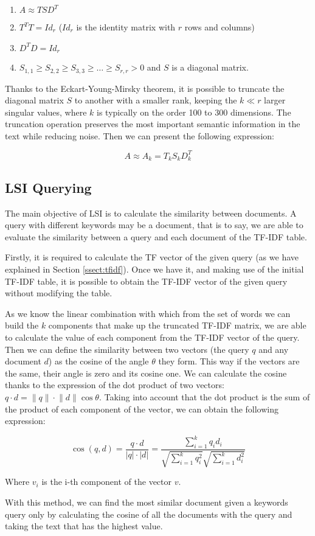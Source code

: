 \begin{enumerate}
	\item $A\approx TSD^T$
	\item $T^TT = Id_r$ ($Id_r$ is the identity matrix with $r$ rows and columns)
	\item $D^TD = Id_r$
	\item $S_{1,1}\geq S_{2,2}\geq S_{3,3}\geq\ldots\geq S_{r,r}>0$ and $S$ is a diagonal matrix.
\end{enumerate}

Thanks to the Eckart-Young-Mirsky \citep{stewart1993early} theorem, it is possible to truncate the diagonal matrix $S$ to another with a smaller rank, keeping the $k\ll r$ larger singular values, where $k$ is typically on the order 100 to 300 dimensions. The truncation operation preserves the most important semantic information in the text while reducing noise. Then we can present the following expression:

$$
A\approx A_k=T_kS_kD_k^T
$$

\subsection{LSI Querying}\label{ssect:query}
The main objective of LSI is to calculate the similarity between documents. A query with different keywords may be a document, that is to say, we are able to evaluate the similarity between a query and each document of the TF-IDF table.

Firstly, it is required to calculate the TF vector of the given query (as we have explained in Section \ref{ssect:tfidf}). Once we have it, and making use of the initial TF-IDF table, it is possible to obtain the TF-IDF vector of the given query without modifying the table.

As we know the linear combination with which from the set of words we can build the $k$ components that make up the truncated TF-IDF matrix, we are able to calculate the value of each component from the TF-IDF vector of the query. Then we can define the similarity between two vectors (the query $q$ and any document $d$) as the cosine of the angle $\theta$ they form. This way if the vectors are the same, their angle is zero and its cosine one. We can calculate the cosine thanks to the expression of the dot product of two vectors: $q\cdot d=\lVert q\rVert\cdot\lVert d\rVert\cos\theta$. Taking into account that the dot product is the sum of the product of each component of the vector, we can obtain the following expression:

$$
\cos(q,d)=\frac{q\cdot d}{\lvert q\rvert\cdot\lvert d\rvert}=\frac{\sum_{i = 1}^kq_id_i}{\sqrt{\sum_{i = 1}^kq_i^2}\sqrt{\sum_{i = 1}^kd_i^2}}
$$

Where $v_i$ is the i-th component of the vector $v$.

With this method, we can find the most similar document given a keywords query only by calculating the cosine of all the documents with the query and taking the text that has the highest value.